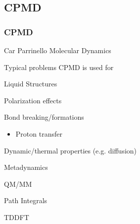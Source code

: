 \documentclass[slidestop,mathserif,compress,xcolor=svgnames]{beamer}
\begin{document}
\subsection{CPMD}
\begin{frame}
  \frametitle{\small CPMD}
  \begin{block}{}
    \begin{itemize}
      \item Car Parrinello Molecular Dynamics
      \item Typical problems CPMD is used for
      \begin{itemize}
	\footnotesize{
	\item Liquid Structures
	\item Polarization effects
	\item Bond breaking/formations
	\begin{itemize}
	  \item Proton transfer
	\end{itemize}
	\item Dynamic/thermal properties (e.g. diffusion)
	\item Metadynamics
	\item QM/MM
	\item Path Integrals
	\item TDDFT
	}
      \end{itemize}
    \end{itemize}
  \end{block}
\end{frame}
\end{document}
